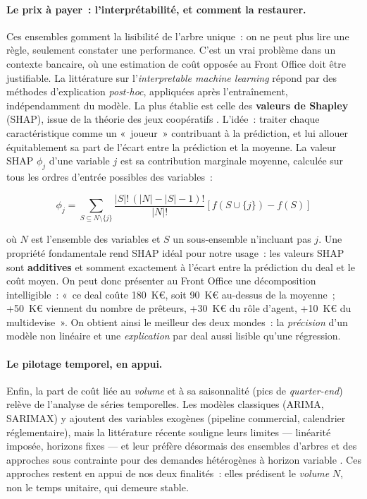 \paragraph{Le prix à payer~: l'interprétabilité, et comment la restaurer.}
Ces ensembles gomment la lisibilité de l'arbre unique~: on ne peut plus lire une règle,
seulement constater une performance. C'est un vrai problème dans un contexte bancaire, où
une estimation de coût opposée au Front Office doit être justifiable. La littérature sur
l'\textit{interpretable machine learning} répond par des méthodes d'explication
\emph{post-hoc}, appliquées après l'entraînement, indépendamment du modèle. La plus
établie est celle des \textbf{valeurs de Shapley} (SHAP), issue de la théorie des jeux
coopératifs \cite{lundberg2017}. L'idée~: traiter chaque caractéristique comme un
«~joueur~» contribuant à la prédiction, et lui allouer équitablement sa part de l'écart
entre la prédiction et la moyenne. La valeur SHAP $\phi_j$ d'une variable $j$ est sa
contribution marginale moyenne, calculée sur tous les ordres d'entrée possibles des
variables~:

\begin{equation}
\phi_j = \sum_{S \subseteq N \setminus \{j\}} \frac{|S|!\,(|N|-|S|-1)!}{|N|!}\left[f(S \cup \{j\}) - f(S)\right]
\label{eq:shap}
\end{equation}

\noindent où $N$ est l'ensemble des variables et $S$ un sous-ensemble n'incluant pas $j$.
Une propriété fondamentale rend SHAP idéal pour notre usage~: les valeurs SHAP sont
\textbf{additives} et somment exactement à l'écart entre la prédiction du deal et le coût
moyen. On peut donc présenter au Front Office une décomposition intelligible~: «~ce deal
coûte 180~K€, soit 90~K€ au-dessus de la moyenne~; +50~K€ viennent du nombre de prêteurs,
+30~K€ du rôle d'agent, +10~K€ du multidevise~». On obtient ainsi le meilleur des deux
mondes~: la \emph{précision} d'un modèle non linéaire et une \emph{explication} par deal
aussi lisible qu'une régression.

\paragraph{Le pilotage temporel, en appui.}
Enfin, la part de coût liée au \emph{volume} et à sa saisonnalité (pics de
\textit{quarter-end}) relève de l'analyse de séries temporelles. Les modèles classiques
(ARIMA, SARIMAX) y ajoutent des variables exogènes (pipeline commercial, calendrier
réglementaire), mais la littérature récente souligne leurs limites --- linéarité imposée,
horizons fixes --- et leur préfère désormais des ensembles d'arbres et des approches sous
contrainte pour des demandes hétérogènes à horizon variable \cite{park2026}. Ces
approches restent en appui de nos deux finalités~: elles prédisent le \emph{volume} $N$,
non le temps unitaire, qui demeure stable.

